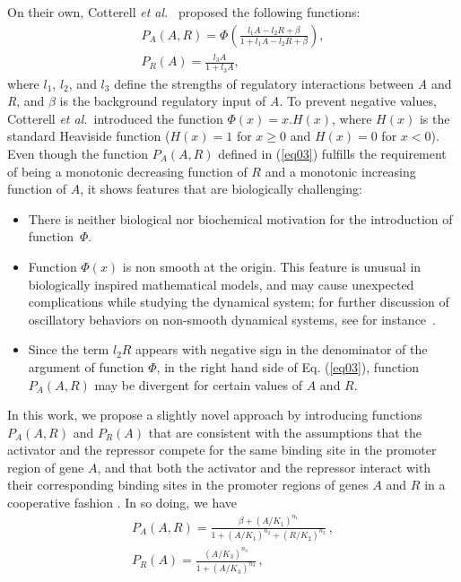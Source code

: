 \documentclass[%
 preprint,
 aip, 
 amsmath,amssymb,
]{revtex4-2}
\begin{document}
On their own, Cotterell {\em et al.}~\cite{Cotterell2015} proposed the following functions:
	\begin{subequations}\label{eq034}
		\begin{gather}
		P_A(A, R) = \displaystyle \Phi \left(
		\frac{l_1 A - l_2 R + \beta}{1 + l_1 A - l_2 R + \beta}
		\right), \label{eq03} \\[3mm]
		P_R(A) = \displaystyle \frac{l_3 A}{1 + l_3 A}, \label{eq04}
		\end{gather}
	\end{subequations}
where $l_1$, $l_2$, and $l_3$ define the strengths of regulatory interactions between \textit{A} and \textit{R}, and $\beta$ is the background regulatory input of \textit{A}. To prevent negative values, Cotterell {\em et al.}~introduced the function $\Phi(x) = x.H(x)$, where $H(x)$ is the standard Heaviside function ($H(x) = 1$ for $x \geq 0$ and $H(x) = 0$ for $x < 0$). Even though the function $P_A(A, R)$ defined in (\ref{eq03}) fulfills the requirement of being a monotonic decreasing function of $R$ and a monotonic increasing function of $A$, it shows features that are biologically challenging:
\begin{itemize}
\item There is neither biological nor biochemical motivation for the introduction of function~$\Phi$.

\item Function $\Phi(x)$ is non smooth at the origin. This feature is unusual in biologically inspired mathematical models, and may cause unexpected complications while studying the dynamical system; for further discussion of oscillatory behaviors on non-smooth dynamical systems, see for instance~\cite{han01,castillo01}.

\item Since the term $l_2 R$ appears with negative sign in the denominator of the argument of function $\Phi$, in the right hand side of Eq. (\ref{eq03}), function $P_A(A, R)$ may be divergent for certain values of $A$ and $R$.
\end{itemize}
In this work, we propose a slightly novel approach by introducing functions $P_A(A, R)$ and $P_R(A)$ that are consistent with the assumptions that the activator and the repressor compete for the same binding site in the promoter region of gene $A$, and that both the activator and the repressor interact with their corresponding binding sites in the promoter regions of genes $A$ and $R$ in a cooperative fashion \cite{Santillan2008b}. In so doing, we have
	\begin{subequations}\label{eq056}
		\begin{gather}
		P_A(A,R) = \displaystyle \frac{\beta + (A/K_1)^{n_1}}{1 + (A/K_1)^{n_2} +
			(R/K_2)^{n_2}}\,, \label{eq05} \\[3mm]
		P_R(A)  = \displaystyle \frac{(A/K_3)^{n_3}}{1 + (A/K_3)^{n_3}}\,,
		\label{eq06}
		\end{gather}
	\end{subequations}
\end{document}
